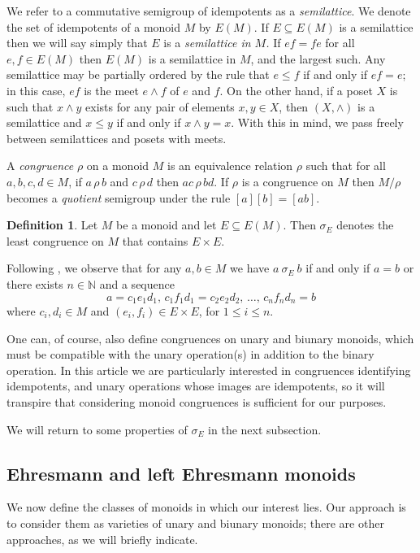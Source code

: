 \documentclass[12pt]{amsart}
\theoremstyle{definition}
\newtheorem{defn}[them]{Definition}
\theoremstyle{definition}
\numberwithin{them}{section}
\numberwithin{equation}{section}
\begin{document}
We refer to a commutative semigroup of idempotents as a {\em semilattice}. We denote the set of idempotents of a monoid 
$M$  by $E(M)$. If $E\subseteq E(M)$ is a semilattice then we will say simply that $E$ is a {\em semilattice in $M$.} If $ef=fe$ for all $e,f\in E(M)$ then  $E(M)$ is a semilattice in $M$, and the largest such. Any semilattice may be partially ordered by the rule that $e\leq f$ if and only if $ef=e$; in this case, $ef$ is the  meet $e\wedge f$ of $e$ and $f$. On the other hand, if a poset $X$ is such that $x\wedge y$ exists for any pair of elements $x,y\in X$, then $(X,\wedge)$ is a semilattice and $x\leq y$ if and only if $x\wedge y=x$. With this in mind, we pass freely between semilattices and posets  with meets.

A {\em congruence} $\rho$ on a monoid $M$ is an equivalence relation $\rho$ such that for all $a,b,c,d\in M$, if $a\,\rho\, b$ and $c\,\rho \, d$ then $ac\,\rho\, bd$. If $\rho$ is a congruence on $M$ then $M/\rho$ becomes a {\em quotient} semigroup under the rule $[a][b]=[ab]$. 

\begin{defn}\label{defn:sigma} Let $M$ be a monoid and let $E\subseteq E(M)$. Then $\sigma_E$ denotes the least  congruence  on $M$ that contains $E\times E$. 
    \end{defn}

Following \cite[Proposition 1.5.9]{H}, we  observe that for any $a, b \in M$ we have  $a\ \sigma_E\ b$ if and only if $a = b$ or there exists  $n\in\mathbb{N}$ and a sequence\[a = c_1e_1d_1, \,c_1f_1d_1=c_2e_2d_2, \,\dots,\,  c_nf_nd_n =b\]
 where  $c_i, d_i\in M$ and  $(e_i, f_i)  \in E \times E$, for $1\leq i\leq n$.

 One can, of course, also define congruences on unary and biunary monoids, which must be compatible with the unary operation(s) in addition to the binary operation. In this article we are particularly interested in congruences identifying idempotents, and unary operations whose images are idempotents, so it will transpire that considering monoid congruences is sufficient for our purposes.  


We will return to some properties of $\sigma_E$
in the next subsection.



\subsection{ Ehresmann and left Ehresmann monoids}\label{sub:leftehresmann}
We now define the classes of monoids in which our interest lies. Our approach is to consider them as  varieties of unary and biunary monoids;  there are other approaches, as we will briefly indicate. 
\end{document}
